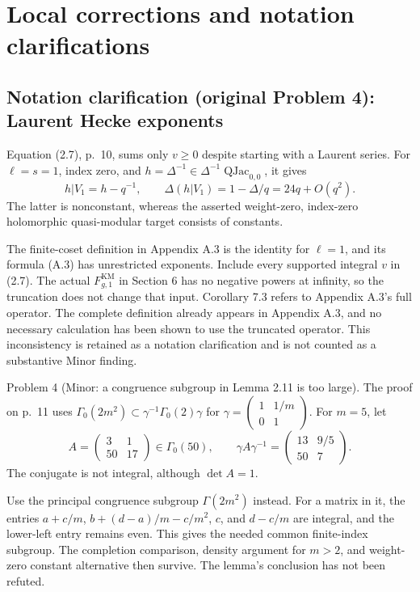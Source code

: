 \documentclass[10pt]{article}
\begin{document}
\section*{Local corrections and notation clarifications}
\subsection*{Notation clarification (original Problem 4): Laurent Hecke exponents}
Equation (2.7), p. 10, sums only \(v\ge0\) despite starting with a Laurent series. For \(\ell=s=1\), index zero, and \(h=\Delta^{-1}\in\Delta^{-1}\mathop{\mathrm{QJac}}_{0,0}\), it gives \[h|V_1=h-q^{-1},\qquad
 \Delta(h|V_1)=1-\Delta/q=24q+O(q^2).\] The latter is nonconstant, whereas the asserted weight-zero, index-zero holomorphic quasi-modular target consists of constants.\par
The finite-coset definition in Appendix A.3 is the identity for \(\ell=1\), and its formula (A.3) has unrestricted exponents. Include every supported integral \(v\) in (2.7). The actual \(F^{\mathrm{KM}}_{g,1}\) in Section 6 has no negative powers at infinity, so the truncation does not change that input. Corollary 7.3 refers to Appendix A.3’s full operator. The complete definition already appears in Appendix A.3, and no necessary calculation has been shown to use the truncated operator. This inconsistency is retained as a notation clarification and is not counted as a substantive Minor finding.\par
Problem 4 (Minor: a congruence subgroup in Lemma 2.11 is too large).  The proof on p. 11 uses \(\Gamma_0(2m^2)\subset\gamma^{-1}\Gamma_0(2)\gamma\) for \(\gamma=\left(\begin{smallmatrix}1&1/m\\0&1\end{smallmatrix}\right)\). For \(m=5\), let \[A=\begin{pmatrix}3&1\\50&17\end{pmatrix}\in\Gamma_0(50),
 \qquad
 \gamma A\gamma^{-1}
   =\begin{pmatrix}13&9/5\\50&7\end{pmatrix}.\] The conjugate is not integral, although \(\det A=1\).\par
Use the principal congruence subgroup \(\Gamma(2m^2)\) instead. For a matrix in it, the entries \(a+c/m\), \(b+(d-a)/m-c/m^2\), \(c\), and \(d-c/m\) are integral, and the lower-left entry remains even. This gives the needed common finite-index subgroup. The completion comparison, density argument for \(m>2\), and weight-zero constant alternative then survive. The lemma’s conclusion has not been refuted.\par
\end{document}
